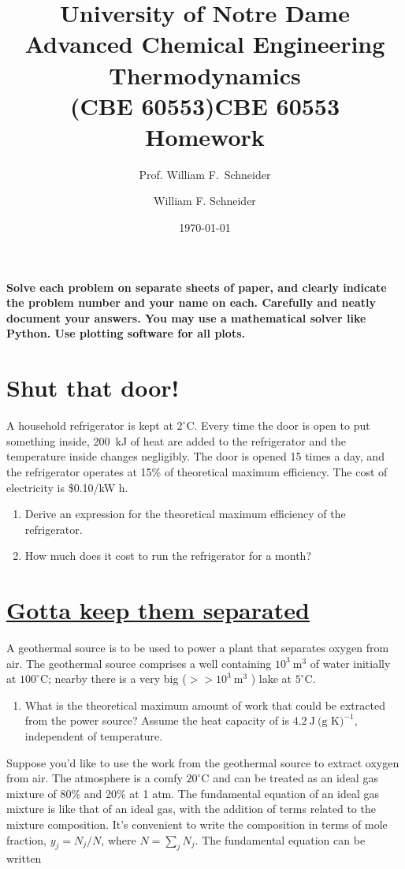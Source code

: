 \documentclass[11pt]{article}
\title{University of Notre Dame\\Advanced Chemical Engineering Thermodynamics\\(CBE 60553)}
\author{Prof. William F.\ Schneider}
\author{William F. Schneider}
\date{\today}
\title{CBE 60553 Homework}
\begin{document}
\begin{OPTIONS}
\end{OPTIONS}

\noindent \textbf{Solve each problem on separate sheets of paper, and clearly indicate the problem number and your name on each.  Carefully and neatly document your answers.  You may use a mathematical solver like Python. Use plotting software for all plots.}

\section{Shut that door!}
\label{sec:org310cd53}
A household refrigerator is kept at  \(2^\circ\text{C}\).  Every time the door is open
   to put something inside, \SI{200}{kJ} of heat are added to the refrigerator and the
   temperature inside changes negligibly.  The door is opened 15 times a day, and the
   refrigerator operates at 15\% of theoretical maximum efficiency.  The cost of
   electricity is \$0.10/kW h.

\begin{enumerate}
\item Derive an expression for the theoretical maximum efficiency of the refrigerator.

\item How much does it cost to run the refrigerator for a month?
\end{enumerate}

\section{\href{https://open.spotify.com/track/5JJDu0Z5DKe7mR31MGksSg}{Gotta keep them separated}}
\label{sec:org5a42589}
A geothermal source is to be used to power a plant that separates oxygen from
  air. The geothermal source comprises a well containing \(10^3~\text{m}^3\) of
  water initially at \(100^\circ\text{C}\); nearby there is a very big (\(>>
  10^3~\text{m}^3\) ) lake at \(5^\circ\text{C}\).

\begin{enumerate}
\item What is the theoretical maximum amount of work that could be extracted from the power source?
Assume the heat capacity of  is \(4.2~\text{J}~\text{(g K)}^{-1}\), independent of temperature.
\end{enumerate}

\noindent Suppose you'd like to use the work from the geothermal source to
  extract oxygen from air.  The atmosphere is a comfy \(20^\circ\text{C}\) and can
  be treated as an ideal gas mixture of 80\%  and 20\%  at 1 atm.
  The fundamental equation of an ideal gas mixture is like that of an ideal gas,
  with the addition of terms related to the mixture composition. It's convenient
  to write the composition in terms of mole fraction, \(y_{j} = N_{j}/N\), where
  \(N = \sum_{j}N_{j}\).  The fundamental equation can be written
\end{document}
